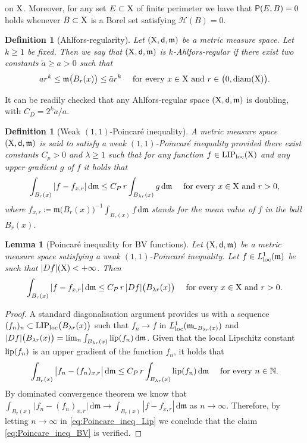 \documentclass[reqno]{amsart}
\numberwithin{equation}{section}
\newcommand{\N}{\mathbb{N}}
\newcommand{\X}{{\rm X}}
\newcommand{\sfd}{{\sf d}}
\newcommand{\mm}{\mathfrak m}
\renewcommand{\d}{{\mathrm d}}
\newcommand{\1}{\mathbbm 1}
\newcommand{\LIP}{{\rm LIP}}
\newcommand{\lip}{{\rm lip}}
\newcommand{\loc}{{\rm loc}}
\renewcommand{\P}{{\sf P}}
\renewcommand{\H}{{\mathcal H}}
\newtheorem{lemma}[theorem]{Lemma}
\newtheorem{definition}[theorem]{Definition}
\begin{document}
on \(\X\). Moreover, for any set \(E\subset\X\) of finite
perimeter we have that \(\P(E,B)=0\) holds whenever \(B\subset\X\)
is a Borel set satisfying \(\H(B)=0\).
%
%
\begin{definition}[Ahlfors-regularity]
Let \((\X,\sfd,\mm)\) be a metric measure space. Let \(k\geq 1\) be fixed.
Then we say that \((\X,\sfd,\mm)\) is \emph{\(k\)-Ahlfors-regular} if
there exist two constants \(\tilde a\geq a>0\) such that
\begin{equation}\label{eq:ineq_Ahlfors}
a r^k\leq\mm\big(B_r(x)\big)\leq\tilde a r^k
\quad\text{ for every }x\in\X\text{ and }r\in\big(0,{\rm diam}(\X)\big).
\end{equation}
\end{definition}
%
%
It can be readily checked that any Ahlfors-regular space \((\X,\sfd,\mm)\) is doubling,
with \(C_D=2^k\tilde a/a\).
%
%
\begin{definition}[Weak \((1,1)\)-Poincar\'{e} inequality]
A metric measure space \((\X,\sfd,\mm)\) is said to satisfy a
\emph{weak \((1,1)\)-Poincar\'{e} inequality} provided there
exist constants \(C_p>0\) and \(\lambda\geq 1\) such that for
any function \(f\in\LIP_\loc(\X)\) and any upper gradient \(g\)
of \(f\) it holds that
\[
\int_{B_r(x)}|f-f_{x,r}|\,\d\mm\leq C_P\,r\int_{B_{\lambda r}(x)}g\,\d\mm
\quad\text{ for every }x\in\X\text{ and }r>0,
\]
where \(f_{x,r}\coloneqq\mm\big(B_r(x)\big)^{-1}\int_{B_r(x)}f\,\d\mm\)
stands for the mean value of \(f\) in the ball \(B_r(x)\).
\end{definition}
%
%
\begin{lemma}[Poincar\'{e} inequality for BV functions]\label{lem:Poincare_ineq_BV}
Let \((\X,\sfd,\mm)\) be a metric measure space satisfying a weak
\((1,1)\)-Poincar\'{e} inequality. Let \(f\in L^1_\loc(\mm)\) be
such that \(|Df|(\X)<+\infty\). Then
\begin{equation}\label{eq:Poincare_ineq_BV}
\int_{B_r(x)}|f-f_{x,r}|\,\d\mm\leq C_P\,r\,|Df|\big(B_{\lambda r}(x)\big)
\quad\text{ for every }x\in\X\text{ and }r>0.
\end{equation}
\end{lemma}
\begin{proof}
A standard diagonalisation argument provides us with a sequence
\((f_n)_n\subset\LIP_\loc\big(B_{\lambda r}(x)\big)\) such that
\(f_n\to f\) in \(L^1_\loc(\mm\llcorner_{B_{\lambda r}(x)})\) and
\(|Df|\big(B_{\lambda r}(x)\big)=\lim_n\int_{B_{\lambda r}(x)}\lip(f_n)\,\d\mm\).
Given that the local Lipschitz constant \(\lip(f_n)\) is an upper gradient of
the function \(f_n\), it holds that
\begin{equation}\label{eq:Poincare_ineq_Lip}
\int_{B_r(x)}\big|f_n-(f_n)_{x,r}\big|\,\d\mm\leq
C_P\,r\int_{B_{\lambda r}(x)}\lip(f_n)\,\d\mm\quad\text{ for every }n\in\N.
\end{equation}
By dominated convergence theorem we know that
\(\int_{B_r(x)}\big|f_n-(f_n)_{x,r}\big|\,\d\mm\to\int_{B_r(x)}|f-f_{x,r}|\,\d\mm\)
as \(n\to\infty\). Therefore, by letting \(n\to\infty\) in \eqref{eq:Poincare_ineq_Lip}
we conclude that the claim \eqref{eq:Poincare_ineq_BV} is verified.
\end{proof}
\end{document}
